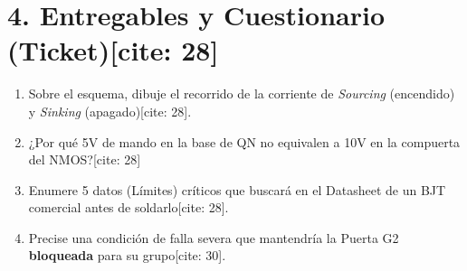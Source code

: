 \documentclass[11pt, a4paper]{article}
\begin{document}
\section*{4. Entregables y Cuestionario (Ticket)[cite: 28]}
\begin{enumerate}
    \setlength\itemsep{0.2em}
    \item Sobre el esquema, dibuje el recorrido de la corriente de \textit{Sourcing} (encendido) y \textit{Sinking} (apagado)[cite: 28].
    \item ¿Por qué 5V de mando en la base de QN no equivalen a 10V en la compuerta del NMOS?[cite: 28]
    \item Enumere 5 datos (Límites) críticos que buscará en el Datasheet de un BJT comercial antes de soldarlo[cite: 28].
    \item Precise una condición de falla severa que mantendría la Puerta G2 \textbf{bloqueada} para su grupo[cite: 30].
\end{enumerate}
\end{document}
